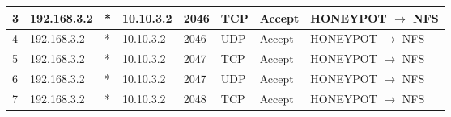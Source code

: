 \documentclass[a4paper, 11pt, oneside]{article}
\begin{document}
\begin{table}[H]
{\begin{tabular}{|llllllll|}
\multicolumn{1}{|l|}{3}           & \multicolumn{1}{l|}{192.168.3.2}                                                  & \multicolumn{1}{l|}{*}                                                              & \multicolumn{1}{l|}{10.10.3.2}                                                        & \multicolumn{1}{l|}{2046}                                                                & \multicolumn{1}{l|}{TCP}               & \multicolumn{1}{l|}{Accept}          & HONEYPOT $\rightarrow$ NFS             \\ \hline
\multicolumn{1}{|l|}{4}           & \multicolumn{1}{l|}{192.168.3.2}                                                  & \multicolumn{1}{l|}{*}                                                              & \multicolumn{1}{l|}{10.10.3.2}                                                        & \multicolumn{1}{l|}{2046}                                                                & \multicolumn{1}{l|}{UDP}               & \multicolumn{1}{l|}{Accept}          & HONEYPOT $\rightarrow$ NFS             \\ \hline
\multicolumn{1}{|l|}{5}           & \multicolumn{1}{l|}{192.168.3.2}                                                  & \multicolumn{1}{l|}{*}                                                              & \multicolumn{1}{l|}{10.10.3.2}                                                        & \multicolumn{1}{l|}{2047}                                                                & \multicolumn{1}{l|}{TCP}               & \multicolumn{1}{l|}{Accept}          & HONEYPOT $\rightarrow$ NFS             \\ \hline
\multicolumn{1}{|l|}{6}           & \multicolumn{1}{l|}{192.168.3.2}                                                  & \multicolumn{1}{l|}{*}                                                              & \multicolumn{1}{l|}{10.10.3.2}                                                        & \multicolumn{1}{l|}{2047}                                                                & \multicolumn{1}{l|}{UDP}               & \multicolumn{1}{l|}{Accept}          & HONEYPOT $\rightarrow$ NFS             \\ \hline
\multicolumn{1}{|l|}{7}           & \multicolumn{1}{l|}{192.168.3.2}                                                  & \multicolumn{1}{l|}{*}                                                              & \multicolumn{1}{l|}{10.10.3.2}                                                        & \multicolumn{1}{l|}{2048}                                                                & \multicolumn{1}{l|}{TCP}               & \multicolumn{1}{l|}{Accept}          & HONEYPOT $\rightarrow$ NFS             \\ \hline

\end{tabular}}
\end{table}
\end{document}

